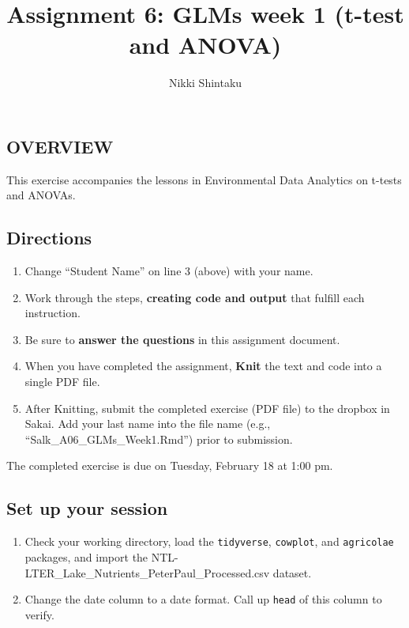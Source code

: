 \documentclass[]{article}
\title{Assignment 6: GLMs week 1 (t-test and ANOVA)}
\author{Nikki Shintaku}
\date{}
\providecommand{\tightlist}{%
  \setlength{\itemsep}{0pt}\setlength{\parskip}{0pt}}
\begin{document}
\maketitle

\hypertarget{overview}{%
\subsection{OVERVIEW}\label{overview}}

This exercise accompanies the lessons in Environmental Data Analytics on
t-tests and ANOVAs.

\hypertarget{directions}{%
\subsection{Directions}\label{directions}}

\begin{enumerate}
\def\labelenumi{\arabic{enumi}.}
\tightlist
\item
  Change ``Student Name'' on line 3 (above) with your name.
\item
  Work through the steps, \textbf{creating code and output} that fulfill
  each instruction.
\item
  Be sure to \textbf{answer the questions} in this assignment document.
\item
  When you have completed the assignment, \textbf{Knit} the text and
  code into a single PDF file.
\item
  After Knitting, submit the completed exercise (PDF file) to the
  dropbox in Sakai. Add your last name into the file name (e.g.,
  ``Salk\_A06\_GLMs\_Week1.Rmd'') prior to submission.
\end{enumerate}

The completed exercise is due on Tuesday, February 18 at 1:00 pm.

\hypertarget{set-up-your-session}{%
\subsection{Set up your session}\label{set-up-your-session}}

\begin{enumerate}
\def\labelenumi{\arabic{enumi}.}
\item
  Check your working directory, load the \texttt{tidyverse},
  \texttt{cowplot}, and \texttt{agricolae} packages, and import the
  NTL-LTER\_Lake\_Nutrients\_PeterPaul\_Processed.csv dataset.
\item
  Change the date column to a date format. Call up \texttt{head} of this
  column to verify.
\end{enumerate}
\end{document}
